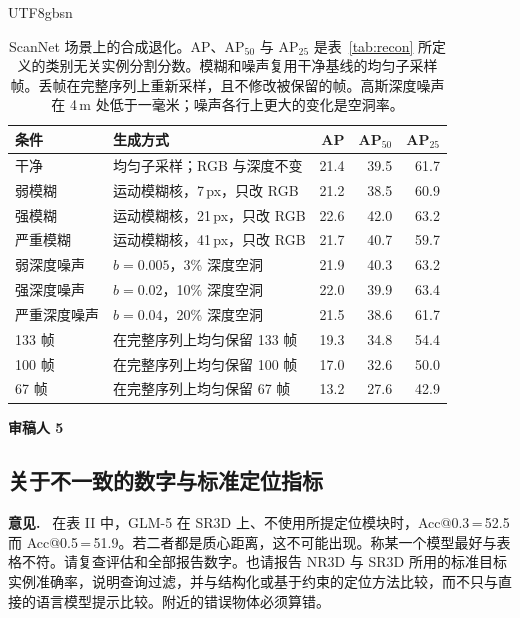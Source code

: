 \documentclass[11pt]{article}
\newcommand{\revcomment}[1]{%
  \par\vspace{0.6em}\noindent\textcolor{revblue}{\textbf{意见.}}\ %
  \textcolor{revblue}{#1}\par\vspace{0.4em}}
\begin{document}
\begin{CJK*}{UTF8}{gbsn}
\begin{table}[ht]
\centering
\caption{ScanNet 场景上的合成退化。AP、AP\(_{50}\) 与 AP\(_{25}\) 是表~\ref{tab:recon} 所定义的类别无关实例分割分数。模糊和噪声复用干净基线的均匀子采样帧。丢帧在完整序列上重新采样，且不修改被保留的帧。高斯深度噪声在 4\,m 处低于一毫米；噪声各行上更大的变化是空洞率。}
\label{tab:robust}
\small
\begin{tabular}{llrrr}
\toprule
条件 & 生成方式 & AP & AP\(_{50}\) & AP\(_{25}\) \\
\midrule
干净 & 均匀子采样；RGB 与深度不变 & 21.4 & 39.5 & 61.7 \\
弱模糊 & 运动模糊核，7\,px，只改 RGB & 21.2 & 38.5 & 60.9 \\
强模糊 & 运动模糊核，21\,px，只改 RGB & 22.6 & 42.0 & 63.2 \\
严重模糊 & 运动模糊核，41\,px，只改 RGB & 21.7 & 40.7 & 59.7 \\
弱深度噪声 & \(b{=}0.005\)，3\% 深度空洞 & 21.9 & 40.3 & 63.2 \\
强深度噪声 & \(b{=}0.02\)，10\% 深度空洞 & 22.0 & 39.9 & 63.4 \\
严重深度噪声 & \(b{=}0.04\)，20\% 深度空洞 & 21.5 & 38.6 & 61.7 \\
133 帧 & 在完整序列上均匀保留 133 帧 & 19.3 & 34.8 & 54.4 \\
100 帧 & 在完整序列上均匀保留 100 帧 & 17.0 & 32.6 & 50.0 \\
67 帧 & 在完整序列上均匀保留 67 帧 & 13.2 & 27.6 & 42.9 \\
\bottomrule
\end{tabular}
\end{table}

\bigskip
\noindent\textcolor{revblue}{\large\textbf{审稿人 5}}

\subsection*{关于不一致的数字与标准定位指标}

\revcomment{在表 II 中，GLM-5 在 SR3D 上、不使用所提定位模块时，Acc@0.3\,=\,52.5 而 Acc@0.5\,=\,51.9。若二者都是质心距离，这不可能出现。称某一个模型最好与表格不符。请复查评估和全部报告数字。也请报告 NR3D 与 SR3D 所用的标准目标实例准确率，说明查询过滤，并与结构化或基于约束的定位方法比较，而不只与直接的语言模型提示比较。附近的错误物体必须算错。}


\end{CJK*}
\end{document}
